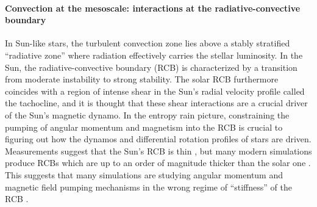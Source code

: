 \documentclass[11pt, preprint, hmargin=1in, vmargin=1in]{aastex62}
\begin{document}
\paragraph{Convection at the mesoscale: interactions at the radiative-convective boundary}
In Sun-like stars, the turbulent convection zone lies above a stably stratified ``radiative zone'' where radiation effectively carries the stellar luminosity.
In the Sun, the radiative-convective boundary (RCB) is characterized by a transition from moderate instability to strong stability.
The solar RCB furthermore coincides with a region of intense shear in the Sun's radial velocity profile called the tachocline, and it is thought that these shear interactions are a crucial driver of the Sun's magnetic dynamo.
In the entropy rain picture, constraining the pumping of angular momentum and magnetism into the RCB is crucial to figuring out how the dynamos and differential rotation profiles of stars are driven.
Measurements suggest that the Sun's RCB is thin \citep{basu1997}, but many modern simulations produce RCBs which are up to an order of magnitude thicker than the solar one \citep{hotta2017}.
This suggests that many simulations are studying angular momentum and magnetic field pumping mechanisms in the wrong regime of ``stiffness'' of the RCB \citep{couston&all2017}.
\end{document}
